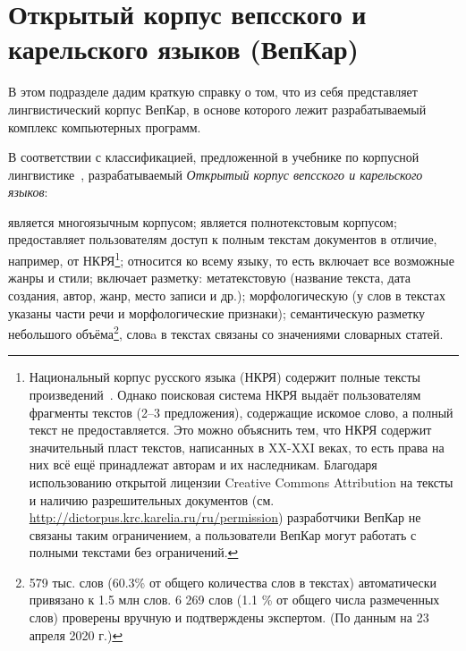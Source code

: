 
\section{Открытый корпус вепсского и карельского языков (ВепКар)} \label{sect_VepKar_about}

В этом подразделе дадим краткую справку о том, что из себя представляет 
лингвистический корпус ВепКар, в основе которого лежит 
разрабатываемый комплекс компьютерных программ.

В соответствии с классификацией, предложенной 
в учебнике по корпусной лингвистике~\cite[с.~12]{Zakharov2005}, 
разрабатываемый \emph{Открытый корпус вепсского и карельского языков}: 
\renewcommand{\outlinei}{itemize}
\renewcommand{\outlineii}{itemize}
\begin{outline}
    \1 является многоязычным корпусом;
    \1 является полнотекстовым корпусом;
    \1 предоставляет пользователям доступ к полным текстам документов в отличие, 
    например, от НКРЯ\footnote{Национальный 
    корпус русского языка (НКРЯ) содержит 
        полные тексты произведений~\cite[с.~12]{Plungyan2004Sichinava}.  
        Однако поисковая система НКРЯ выдаёт пользователям фрагменты текстов (2--3 предложения), 
        содержащие искомое слово, а полный текст не предоставляется. 
        Это можно объяснить тем, что НКРЯ содержит значительный пласт текстов, 
        написанных в XX-XXI веках, 
        то есть права на них всё ещё принадлежат авторам и их наследникам. 
        Благодаря использованию открытой лицензии Creative Commons Attribution на тексты 
        и наличию разрешительных документов
        (см. \url{http://dictorpus.krc.karelia.ru/ru/permission}) 
        разработчики ВепКар не связаны таким ограничением,  
        а пользователи ВепКар могут работать с полными текстами без ограничений.
    };
    \1 относится ко всему языку, то есть включает все возможные жанры и стили; 
    \1 включает разметку:
        \2[\textbullet] метатекстовую (название текста, дата создания, автор, жанр, место записи и др.);
        \2[\textbullet] морфологическую (у слов в текстах указаны части речи и морфологические признаки);
        \2[\textbullet] семантическую разметку небольшого объёма\footnote{ 579 тыс. слов (60.3\% от общего количества слов в
         	             текстах) автоматически привязано к 1.5 млн  слов. 6 269 слов (1.1 \% от общего числа размеченных слов) 
         	             проверены вручную и подтверждены экспертом.
                        (По данным на 23 апреля 2020 г.)}, словa в текстах связаны со значениями словарных статей.
\end{outline}

